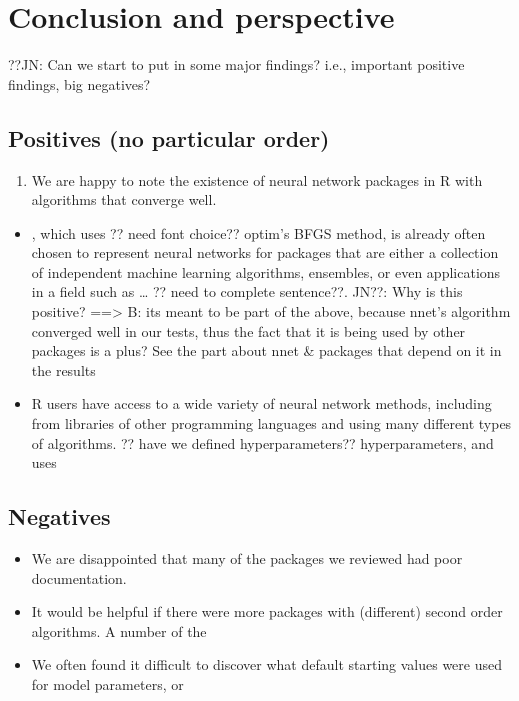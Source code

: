 \hypertarget{conclusion-and-perspective}{%
\section{Conclusion and perspective}\label{conclusion-and-perspective}}

??JN: Can we start to put in some major findings? i.e., important
positive findings, big negatives?

\hypertarget{positives-no-particular-order}{%
\subsection{Positives (no particular
order)}\label{positives-no-particular-order}}

\begin{enumerate}
\def\labelenumi{\arabic{enumi}.}
\tightlist
\item
  We are happy to note the existence of neural network packages in R
  with algorithms that converge well.
\end{enumerate}

\begin{itemize}
\tightlist
\item
  , which uses ?? need font choice?? optim's BFGS method, is
  already often chosen to represent neural networks for packages that
  are either a collection of independent machine learning algorithms,
  ensembles, or even applications in a field such as \ldots{} ?? need to
  complete sentence??. JN??: Why is this positive? ==\textgreater{} B:
  its meant to be part of the above, because nnet's algorithm converged
  well in our tests, thus the fact that it is being used by other
  packages is a plus? See the part about nnet \& packages that depend on
  it in the results
\item
  R users have access to a wide variety of neural network methods,
  including from libraries of other programming languages and using many
  different types of algorithms. ?? have we defined hyperparameters??
  hyperparameters, and uses 
\end{itemize}

\hypertarget{negatives}{%
\subsection{Negatives}\label{negatives}}

\begin{itemize}
\tightlist
\item
  We are disappointed that many of the packages we reviewed had poor
  documentation.
\item
  It would be helpful if there were more packages with (different)
  second order algorithms. A number of the 
\item
  We often found it difficult to discover what default starting values
  were used for model parameters, or 
\end{itemize}

